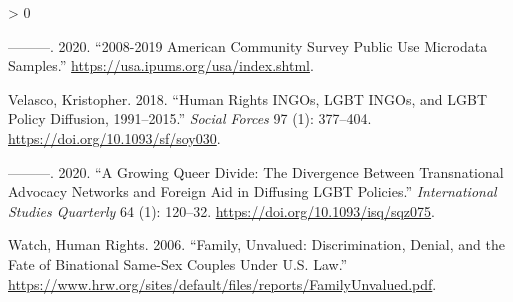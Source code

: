 \documentclass[
  11pt,
]{article}
\newlength{\cslhangindent}
\newenvironment{CSLReferences}[2] %
 {%
  \setlength{\parindent}{0pt}
  \ifodd #1 \everypar{\setlength{\hangindent}{\cslhangindent}}\ignorespaces\fi
  \ifnum #2 > 0
  \setlength{\parskip}{#2\baselineskip}
  \fi
 }%
 {}
\begin{document}
\begin{CSLReferences}{1}{0}
\leavevmode\hypertarget{ref-u.s.censusbureau_2020}{}%
---------. 2020. {``2008-2019 {American} {Community} {Survey} {Public} {Use} {Microdata} {Samples}.''} \url{https://usa.ipums.org/usa/index.shtml}.

\leavevmode\hypertarget{ref-velasco_2018}{}%
Velasco, Kristopher. 2018. {``Human {Rights} {INGOs}, {LGBT} {INGOs}, and {LGBT} {Policy} {Diffusion}, 1991--2015.''} \emph{Social Forces} 97 (1): 377--404. \url{https://doi.org/10.1093/sf/soy030}.

\leavevmode\hypertarget{ref-velasco_2020}{}%
---------. 2020. {``A {Growing} {Queer} {Divide}: {The} {Divergence} Between {Transnational} {Advocacy} {Networks} and {Foreign} {Aid} in {Diffusing} {LGBT} {Policies}.''} \emph{International Studies Quarterly} 64 (1): 120--32. \url{https://doi.org/10.1093/isq/sqz075}.

\leavevmode\hypertarget{ref-humanrightswatch_2006}{}%
Watch, Human Rights. 2006. {``Family, {Unvalued}: {Discrimination}, {Denial}, and the {Fate} of {Binational} {Same}-{Sex} {Couples} Under {U}.{S}. {Law}.''} \url{https://www.hrw.org/sites/default/files/reports/FamilyUnvalued.pdf}.

\end{CSLReferences}
\end{document}
